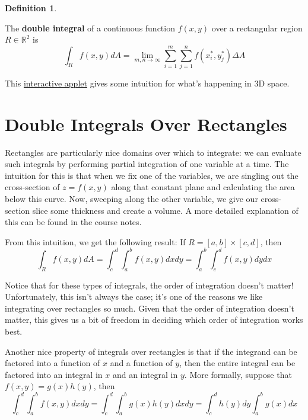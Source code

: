 \documentclass[
]{book}
\theoremstyle{definition}
\newtheorem{definition}{Definition}[chapter]
\theoremstyle{definition}
\theoremstyle{definition}
\theoremstyle{definition}
\theoremstyle{remark}
\begin{document}
\begin{definition}
\protect\hypertarget{def:unlabeled-div-76}{}\label{def:unlabeled-div-76}

The \textbf{double integral} of a continuous function \(f(x,y)\) over a rectangular region \(R\in \mathbb{R}^2\) is \[\displaystyle \int_R f(x,y)dA =\lim_{m, n \to \infty}\sum_{i=1}^m\sum_{j=1}^nf(x_i^*, y_j^*)\Delta A\]

\end{definition}

This \href{https://www.geogebra.org/m/mcyzpeeh}{interactive applet} gives some intuition for what's happening in 3D space.

\hypertarget{double-integrals-over-rectangles}{%
\section{Double Integrals Over Rectangles}\label{double-integrals-over-rectangles}}

Rectangles are particularly nice domains over which to integrate: we can evaluate such integrals by performing partial integration of one variable at a time. The intuition for this is that when we fix one of the variables, we are singling out the cross-section of \(z=f(x,y)\) along that constant plane and calculating the area below this curve. Now, sweeping along the other variable, we give our cross-section slice some thickness and create a volume. A more detailed explanation of this can be found in the course notes.

From this intuition, we get the following result: If \(R=[a,b]\times[c,d]\), then \[\displaystyle \int_R f(x,y) dA=\int_c^d \int_a^b f(x,y) dx dy = \int_a^b \int_c^d f(x,y) dy dx\]

Notice that for these types of integrals, the order of integration doesn't matter! Unfortunately, this isn't always the case; it's one of the reasons we like integrating over rectangles so much. Given that the order of integration doesn't matter, this gives us a bit of freedom in deciding which order of integration works best.

Another nice property of integrals over rectangles is that if the integrand can be factored into a function of \(x\) and a function of \(y\), then the entire integral can be factored into an integral in \(x\) and an integral in \(y\). More formally, suppose that \(f(x,y)=g(x)h(y)\), then \[\displaystyle \int_c^d\int_a^b f(x,y) dxdy = \displaystyle \int_c^d\int_a^b g(x)h(y) dxdy=\displaystyle \int_c^dh(y)dy\int_a^b g(x) dx\]
\end{document}
